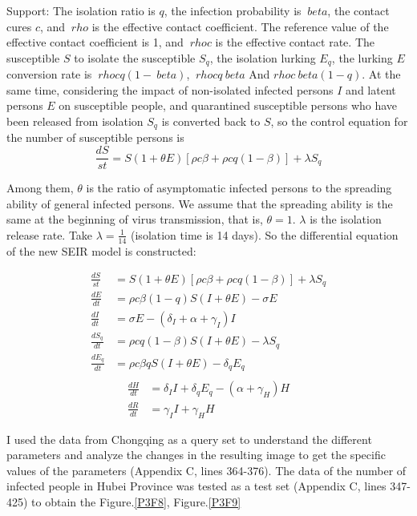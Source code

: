 \documentclass[a4paper, 11pt,twoside=true]{scrartcl}
\begin{document}
\quad Support: The isolation ratio is $ q $, the infection probability is $ \ beta $, the contact cures $ c $, and $ \ rho $ is the effective contact coefficient. The reference value of the effective contact coefficient is 1, and $ \ rho c $ is the effective contact rate. The susceptible $ S $ to isolate the susceptible $ S_q $, the isolation lurking $ E_q $, the lurking $ E $ conversion rate is $ \ rho cq (1- \ beta) $, $ \ rho cq \ beta $ And  $ rho c \ beta(1-q)$. At the same time, considering the impact of non-isolated infected persons $I$ and latent persons $E$ on susceptible people, and quarantined susceptible persons who have been released from isolation $S_q$ is converted back to $S$, so the control equation for the number of susceptible persons is
$$
\frac{dS}{st}=S(1+\theta E)\left[ \rho c \beta + \rho cq(1-\beta) \right]+\lambda S_q
$$

\quad Among them, $\theta$ is the ratio of asymptomatic infected persons to the spreading ability of general infected persons. We assume that the spreading ability is the same at the beginning of virus transmission, that is, $\theta =1$. $\lambda$ is the isolation release rate. Take $\lambda=\frac{1}{14}$ (isolation time is 14 days). So the differential equation of the new SEIR model is constructed:

$$
\begin{aligned}
\frac{dS}{st}&=S(1+\theta E)\left[ \rho c \beta + \rho cq(1-\beta) \right]+\lambda S_q \\
\frac{dE}{dt}&=\rho c \beta (1-q)S(I+\theta E)-\sigma E \\
\frac{dI}{dt}&=\sigma E-\left( \delta_I +\alpha +\gamma_I \right)I \\
\frac{dS_q}{dt}&=\rho c q(1-\beta)S(I+\theta E)-\lambda S_q \\
\frac{dE_q}{dt}&=\rho c \beta q S(I+\theta E)-\delta_qE_q \\
\end{aligned}
$$
$$
\begin{aligned}
\frac{dH}{dt}&=\delta_II+\delta_qE_q-\left( \alpha + \gamma_H \right)H \\
\frac{dR}{dt}&=\gamma_II+\gamma_HH
\end{aligned}
$$

\quad I used the data from Chongqing as a query set to understand the different parameters and analyze the changes in the resulting image to get the specific values of the parameters (Appendix C, lines 364-376). The data of the number of infected people in Hubei Province was tested as a test set (Appendix C, lines 347-425) to obtain the Figure.\ref{P3F8}, Figure.\ref{P3F9}
\end{document}
